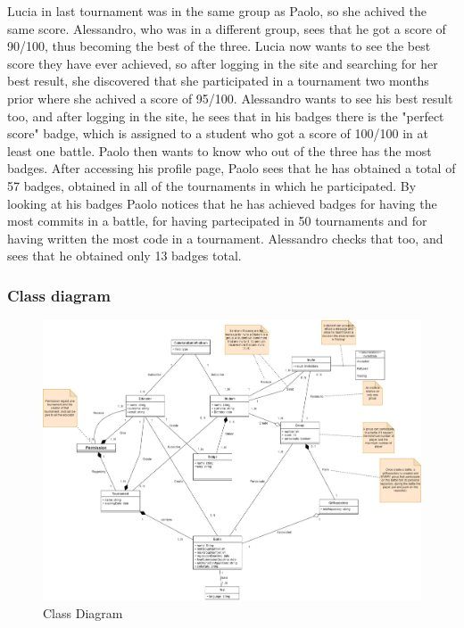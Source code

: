 \documentclass{article}
\begin{document}
{Lucia in last tournament was in the same group as Paolo, so she achived the same score. Alessandro, who was in a different group, sees that he got a score of 90/100, 
thus becoming the best of the three. Lucia now wants to see the best score they have ever achieved, so after logging in the site and searching for her best result, 
she discovered that she participated in a tournament two months prior where she achived a score of 95/100. 
Alessandro wants to see his best result too, and after logging in the site, he sees that in his badges there is the "perfect score" badge, 
which is assigned to a student who got a score of 100/100 in at least one battle.
Paolo then wants to know who out of the three has the most badges. 
After accessing his profile page, Paolo sees that he has obtained a total of 57 badges, obtained in all of the tournaments in which he participated. 
By looking at his badges Paolo notices that he has achieved badges for having the most commits in a battle, for having partecipated in 50 tournaments and 
for having written the most code in a tournament. 
Alessandro checks that too, and sees that he obtained only 13 badges total.

\subsubsection{Class diagram}
\begin{figure}[H]
    \centering
    \hspace*{-4.3cm}\includegraphics[scale=0.38]{images/ClassDiagram/Final.jpg}
    \caption{Class Diagram}
    \label{fig:classDiagram}
\end{figure}

}
\end{document}
